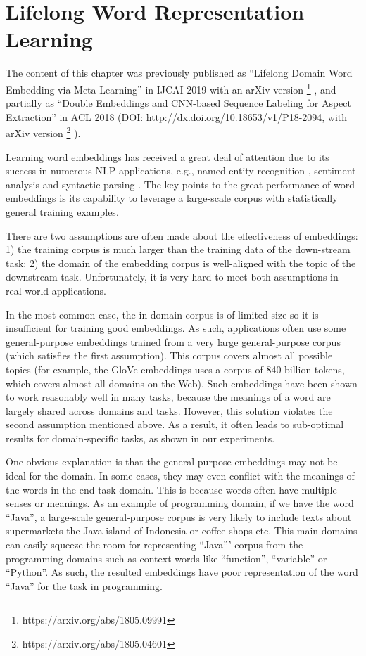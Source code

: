 
\chapter{Lifelong Word Representation Learning}
\label{chap3:word}

The content of this chapter was previously published as ``Lifelong Domain Word Embedding via Meta-Learning'' in IJCAI 2019 \cite{xumeta} with an arXiv version \footnote{https://arxiv.org/abs/1805.09991} \cite{xu2018lifelong}, and partially as ``Double Embeddings and CNN-based Sequence Labeling for Aspect Extraction'' in ACL 2018 \cite{xu_acl2018} (DOI: http://dx.doi.org/10.18653/v1/P18-2094, with arXiv version \footnote{https://arxiv.org/abs/1805.04601} \cite{xu2018double}).

Learning word embeddings \cite{mnih2007three,mikolov2013efficient,mikolov2013distributed,pennington2014glove}
has received a great deal of attention due to its success in numerous NLP applications, e.g., named entity recognition \cite{sienvcnik2015adapting}, sentiment analysis \cite{maas2011learning} and syntactic parsing \cite{durrett2015neural}.
The key points to the great performance of word embeddings is its capability to leverage a large-scale corpus with statistically general training examples.

There are two assumptions are often made about the effectiveness of embeddings: 
1) the training corpus is much larger than the training data of the down-stream task; 2) the domain of the embedding corpus is well-aligned with the topic of the downstream task.
Unfortunately, it is very hard to meet both assumptions in real-world applications.

In the most common case, the in-domain corpus is of limited size so it is insufficient for training good embeddings. 
As such, applications often use some general-purpose embeddings trained from a very large general-purpose corpus (which satisfies the first assumption).
This corpus covers almost all possible topics (for example, the GloVe embeddings \cite{pennington2014glove} uses a corpus of 840 billion tokens, which covers almost all domains on the Web). 
Such embeddings have been shown to work reasonably well in many tasks, because the meanings of a word are largely shared across domains and tasks. 
However, this solution violates the second assumption mentioned above.
As a result, it often leads to sub-optimal results for domain-specific tasks, as shown in our experiments.

One obvious explanation is that the general-purpose embeddings may not be ideal for the domain.
In some cases, they may even conflict with the meanings of the words in the end task domain.
This is because words often have multiple senses or meanings.
As an example of programming domain, if we have the word ``Java'', a large-scale general-purpose corpus is very likely to include texts about supermarkets the Java island of Indonesia or coffee shops etc.
This main domains can easily squeeze the room for representing ``Java''' corpus from the programming domains such as context words like ``function'', ``variable'' or ``Python''.
As such, the resulted embeddings have poor representation of the word ``Java'' for the task in programming.  


